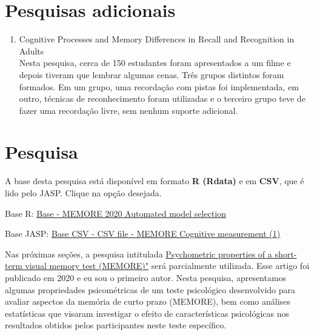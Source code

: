 \documentclass[
]{book}
\providecommand{\tightlist}{%
  \setlength{\itemsep}{0pt}\setlength{\parskip}{0pt}}
\newenvironment{base}{
  \definecolor{shadecolor}{rgb}{0.972,0.972,0.972}  %
  \color{black}
  \begin{shaded}}
 {\end{shaded}}
\begin{document}
\hypertarget{pesquisas-adicionais-4}{%
\section{Pesquisas adicionais}\label{pesquisas-adicionais-4}}

\begin{enumerate}
\def\labelenumi{\arabic{enumi}.}
\tightlist
\item
  Cognitive Processes and Memory Differences in Recall and Recognition in Adults\\
  Nesta pesquisa, cerca de 150 estudantes foram apresentados a um filme e depois tiveram que lembrar algumas cenas. Três grupos distintos foram formados. Em um grupo, uma recordação com pistas foi implementada, em outro, técnicas de reconhecimento foram utilizadas e o terceiro grupo teve de fazer uma recordação livre, sem nenhum suporte adicional.
\end{enumerate}

\hypertarget{pesquisa-5}{%
\section{Pesquisa}\label{pesquisa-5}}

\begin{base}
A base desta pesquisa está disponível em formato \textbf{R (Rdata)} e em \textbf{CSV}, que é lido pelo JASP. Clique na opção desejada.

Base R: \href{https://github.com/anovabr/mqt/raw/master/bases/Base\%20-\%20MEMORE\%202020\%20Automated\%20model\%20selection.RData}{Base - MEMORE 2020 Automated model selection}

Base JASP: \href{https://github.com/anovabr/mqt/raw/master/bases/bases_csv_jasp.zip}{Base CSV - CSV file - MEMORE Cognitive measurement (1)}

\end{base}

Nas próximas seções, a pesquisa intitulada \href{https://www.neuropsicolatina.org/index.php/Neuropsicologia_Latinoamericana/article/view/545}{Psychometric properties of a short-term visual memory test (MEMORE)"} será parcialmente utilizada. Esse artigo foi publicado em 2020 e eu sou o primeiro autor. Nesta pesquisa, apresentamos algumas propriedades psicométricas de um teste psicológico desenvolvido para avaliar aspectos da memória de curto prazo (MEMORE), bem como análises estatísticas que visaram investigar o efeito de características psicológicas nos resultados obtidos pelos participantes neste teste específico.
\end{document}
